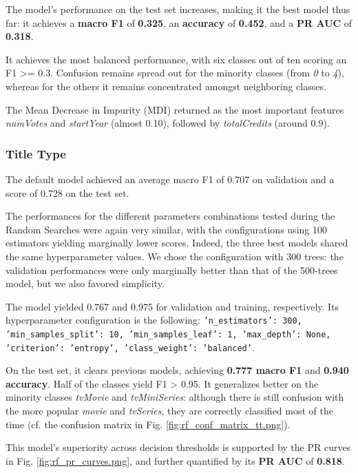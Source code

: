 The model's performance on the test set increases, making it the best model thus far: it achieves a \textbf{macro F1} of \textbf{0.325}, an \textbf{accuracy} of \textbf{0.452}, and a \textbf{PR AUC} of \textbf{0.318}.

It achieves the most balanced performance, with six classes out of ten scoring an F1 >= 0.3. Confusion remains spread out for the minority classes (from \textit{0} to \textit{4}), whereas for the others it remains concentrated amongst neighboring classes.

The Mean Decrease in Impurity (MDI) returned as the most important features \textit{numVotes} and \textit{startYear} (almost 0.10), followed by \textit{totalCredits} (around 0.9).

\subsubsection{Title Type}
The default model achieved an average macro F1 of 0.707 on validation and a score of 0.728 on the test set.

The performances for the different parameters combinations tested during the Random Searches were again very similar, with the configurations using 100 estimators yielding marginally lower scores. Indeed, the three best models shared the same hyperparameter values. We chose the configuration with 300 trees: the validation performances were only marginally better than that of the 500-trees model, but we also favored simplicity.

The model yielded 0.767 and 0.975 for validation and training, respectively. Its hyperparameter configuration is the following: \texttt{'n\_estimators': 300, 'min\_samples\_split': 10, 'min\_samples\_leaf': 1, 'max\_depth': None, 'criterion': 'entropy', 'class\_weight': 'balanced'}. 

On the test set, it clears previous models, achieving \textbf{0.777 macro F1} and \textbf{0.940 accuracy}. Half of the classes yield F1 > 0.95. It generalizes better on the minority classes \textit{tvMovie} and \textit{tvMiniSeries}: although there is still confusion with the more popular \textit{movie} and \textit{tvSeries}, they are correctly classified most of the time (cf. the confusion matrix in Fig. \ref{fig:rf_conf_matrix_tt.png}).

This model's superiority across decision thresholds is supported by the PR curves in Fig. \ref{fig:rf_pr_curves.png}, and further quantified by its \textbf{PR AUC} of \textbf{0.818}.

